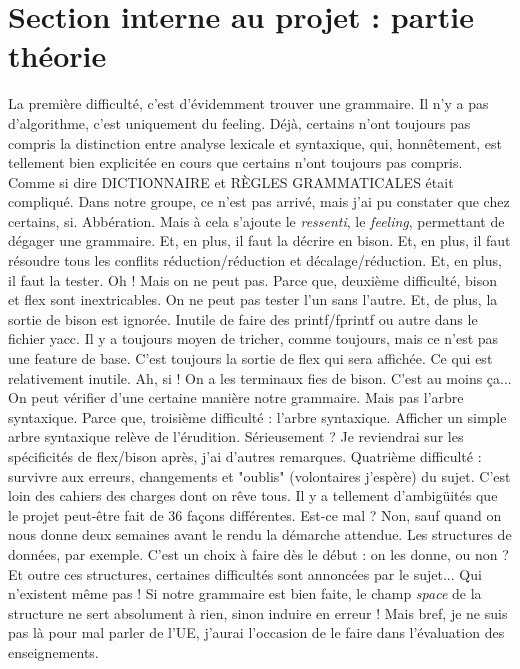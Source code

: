\section{Section interne au projet : partie théorie}

La première difficulté, c'est d'évidemment trouver une grammaire. Il n'y a pas d'algorithme, c'est uniquement du feeling. Déjà, certains n'ont toujours pas compris la distinction entre analyse lexicale et syntaxique, qui, honnêtement, est tellement bien explicitée en cours que certains n'ont toujours pas compris. Comme si dire DICTIONNAIRE et RÈGLES GRAMMATICALES était compliqué. Dans notre groupe, ce n'est pas arrivé, mais j'ai pu constater que chez certains, si. Abbération. 
\newline \newline
Mais à cela s'ajoute le \emph{ressenti}, le \emph{feeling}, permettant de dégager une grammaire. Et, en plus, il faut la décrire en bison. Et, en plus, il faut résoudre tous les conflits réduction/réduction et décalage/réduction. Et, en plus, il faut la tester. Oh ! Mais on ne peut pas.
\newline \newline
Parce que, deuxième difficulté, bison et flex sont inextricables. On ne peut pas tester l'un sans l'autre. Et, de plus, la sortie de bison est ignorée. Inutile de faire des printf/fprintf ou autre dans le fichier yacc. Il y a toujours moyen de tricher, comme toujours, mais ce n'est pas une feature de base. C'est toujours la sortie de flex qui sera affichée. Ce qui est relativement inutile. Ah, si ! On a les terminaux fies de bison. C'est au moins ça... On peut vérifier d'une certaine manière notre grammaire. Mais pas l'arbre syntaxique. \newline \newline
Parce que, troisième difficulté : l'arbre syntaxique. Afficher un simple arbre syntaxique relève de l'érudition. Sérieusement ? Je reviendrai sur les spécificités de flex/bison après, j'ai d'autres remarques. \newline \newline
Quatrième difficulté : survivre aux erreurs, changements et "oublis" (volontaires j'espère) du sujet. C'est loin des cahiers des charges dont on rêve tous. Il y a tellement d'ambigüités que le projet peut-être fait de 36 façons différentes. Est-ce mal ? Non, sauf quand on nous donne deux semaines avant le rendu la démarche attendue. Les structures de données, par exemple. C'est un choix à faire dès le début : on les donne, ou non ? Et outre ces structures, certaines difficultés sont annoncées par le sujet... Qui n'existent même pas ! Si notre grammaire est bien faite, le champ \emph{space} de la structure ne sert absolument à rien, sinon induire en erreur ! Mais bref, je ne suis pas là pour mal parler de l'UE, j'aurai l'occasion de le faire dans l'évaluation des enseignements.
